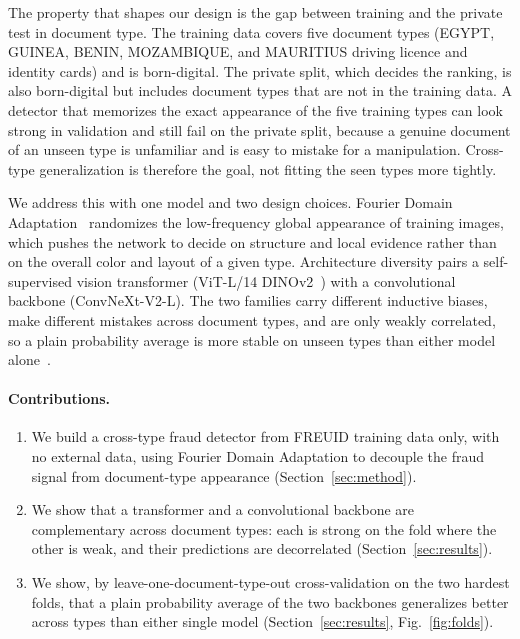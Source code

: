 \documentclass[11pt,a4paper]{article}
\begin{document}
The property that shapes our design is the gap between training and the private test in document type. The
training data covers five document types (EGYPT, GUINEA, BENIN, MOZAMBIQUE, and MAURITIUS driving licence and
identity cards) and is born-digital. The private split, which decides the ranking, is also born-digital but
includes document types that are not in the training data. A detector that memorizes the exact appearance of
the five training types can look strong in validation and still fail on the private split, because a genuine
document of an unseen type is unfamiliar and is easy to mistake for a manipulation. Cross-type generalization
is therefore the goal, not fitting the seen types more tightly.

We address this with one model and two design choices. Fourier Domain Adaptation~\cite{fda} randomizes the
low-frequency global appearance of training images, which pushes the network to decide on structure and
local evidence rather than on the overall color and layout of a given type. Architecture diversity pairs a
self-supervised vision transformer (ViT-L/14 DINOv2~\cite{dinov2,vit}) with a convolutional backbone
(ConvNeXt-V2-L). The two families carry different inductive biases, make different mistakes across document
types, and are only weakly correlated, so a plain probability average is more stable on unseen types than
either model alone~\cite{deepensembles}.

\paragraph{Contributions.}
\begin{enumerate}[leftmargin=1.3em,itemsep=1pt,topsep=2pt]
  \item We build a cross-type fraud detector from FREUID training data only, with no external data, using
        Fourier Domain Adaptation to decouple the fraud signal from document-type appearance
        (Section~\ref{sec:method}).
  \item We show that a transformer and a convolutional backbone are complementary across document types:
        each is strong on the fold where the other is weak, and their predictions are decorrelated
        (Section~\ref{sec:results}).
  \item We show, by leave-one-document-type-out cross-validation on the two hardest folds, that a plain
        probability average of the two backbones generalizes better across types than either single model
        (Section~\ref{sec:results}, Fig.~\ref{fig:folds}).
\end{enumerate}
\end{document}
